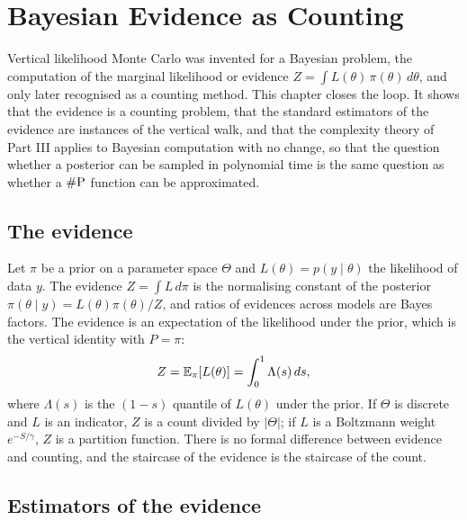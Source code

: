 \chapter{Bayesian Evidence as Counting}
\label{ch:bayes}

Vertical likelihood Monte Carlo was invented for a Bayesian problem, the computation of the marginal likelihood or evidence $Z = \int L(\theta) \, \pi(\theta) \, d\theta$, and only later recognised as a counting method. This chapter closes the loop. It shows that the evidence is a counting problem, that the standard estimators of the evidence are instances of the vertical walk, and that the complexity theory of Part III applies to Bayesian computation with no change, so that the question whether a posterior can be sampled in polynomial time is the same question as whether a $\#\mathrm{P}$ function can be approximated.

\section{The evidence}

Let $\pi$ be a prior on a parameter space $\Theta$ and $L(\theta) = p(y \mid \theta)$ the likelihood of data $y$. The evidence $Z = \int L \, d\pi$ is the normalising constant of the posterior $\pi(\theta \mid y) = L(\theta) \pi(\theta) / Z$, and ratios of evidences across models are Bayes factors. The evidence is an expectation of the likelihood under the prior, which is the vertical identity with $P = \pi$:
\[
Z = \mathbb{E}_\pi[L(\theta)] = \int_0^1 \Lambda(s) \, ds ,
\]
where $\Lambda(s)$ is the $(1 - s)$ quantile of $L(\theta)$ under the prior. If $\Theta$ is discrete and $L$ is an indicator, $Z$ is a count divided by $|\Theta|$; if $L$ is a Boltzmann weight $e^{-S/\gamma}$, $Z$ is a partition function. There is no formal difference between evidence and counting, and the staircase of the evidence is the staircase of the count.

\section{Estimators of the evidence}

